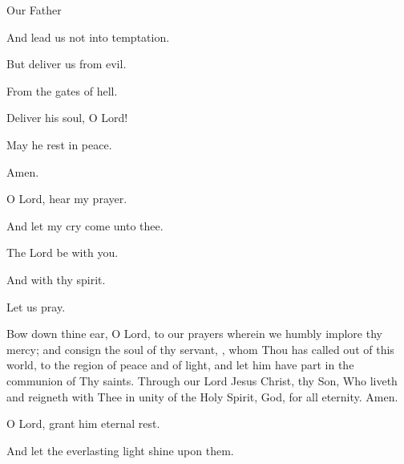 Our Father 

\rubric{\Vbar} And lead us not into temptation.

\rubric{\Rbar} But deliver us from evil.

\rubric{\Vbar} From the gates of hell.

\rubric{\Rbar} Deliver his soul, O Lord!

\rubric{\Vbar} May he rest in peace.

\rubric{\Rbar} Amen.

\rubric{\Vbar} O Lord, hear my prayer.

\rubric{\Rbar} And let my cry come unto thee.

\rubric{\Vbar} The Lord be with you.

\rubric{\Rbar} And with thy spirit.

Let us pray.

Bow down thine ear, O Lord, to our prayers wherein we humbly implore thy mercy; and consign the soul of thy servant, , whom Thou has called out of this world, to the region of peace and of light, and let him have part in the communion of Thy saints. Through our Lord Jesus Christ, thy Son, Who liveth and reigneth with Thee in unity of the Holy Spirit, God, for all eternity. \rubric{\Rbar} Amen.

\rubric{\Vbar} O Lord, grant him eternal rest.

\rubric{\Rbar} And let the everlasting light shine upon them.